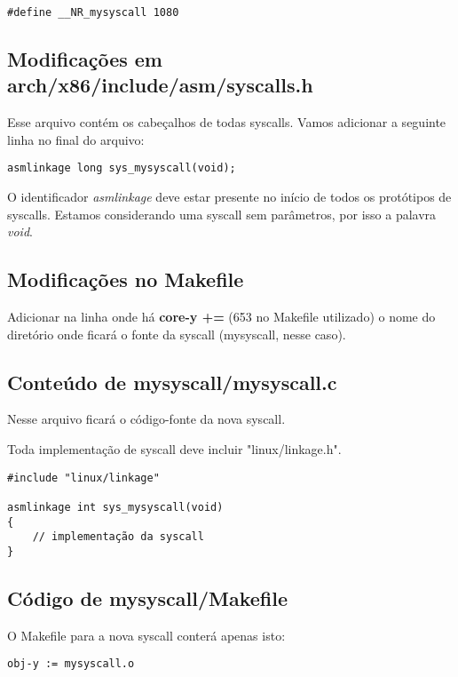 \documentclass{article}
\begin{document}
\begin{verbatim}
#define __NR_mysyscall 1080
\end{verbatim}


\subsection{Modificações em arch/x86/include/asm/syscalls.h}

Esse arquivo contém os cabeçalhos de todas syscalls. Vamos adicionar a seguinte linha no final do arquivo:


\begin{verbatim}
asmlinkage long sys_mysyscall(void);
\end{verbatim}

O identificador \textit{asmlinkage} deve estar presente no início de todos os protótipos de syscalls. Estamos
considerando uma syscall sem parâmetros, por isso a palavra \textit{void}.


\subsection{Modificações no Makefile}

Adicionar na linha onde há \textbf{core-y +=} (653 no Makefile utilizado) o nome do diretório onde ficará o fonte da syscall
(mysyscall, nesse caso).


\subsection{Conteúdo de mysyscall/mysyscall.c}

Nesse arquivo ficará o código-fonte da nova syscall. 

Toda implementação de syscall deve incluir "linux/linkage.h".


\begin{verbatim}
#include "linux/linkage"

asmlinkage int sys_mysyscall(void)
{
    // implementação da syscall
}
\end{verbatim}


\subsection{Código de mysyscall/Makefile}

O Makefile para a nova syscall conterá apenas isto:


\begin{verbatim}
obj-y := mysyscall.o 
\end{verbatim}
\end{document}
